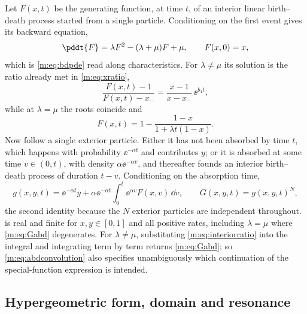 Let $F(x,t)$ be the generating function, at time $t$, of an interior linear
birth--death process started from a single particle. Conditioning on the first
event gives its backward equation,
\begin{equation}
\label{m:eq:interiorbackward}
\pddt{F} = \lambda F^2 - (\lambda+\mu)F + \mu,
\qquad F(x,0)=x ,
\end{equation}
which is \cref{m:eq:bdpde} read along characteristics. For $\lambda\neq\mu$ its
solution is the ratio already met in \cref{m:eq:xratio},
\begin{equation}
\label{m:eq:interiorratio}
\frac{F(x,t)-1}{F(x,t)-x_-} = \frac{x-1}{x-x_-}\,\ee^{b_1t},
\end{equation}
while at $\lambda=\mu$ the roots coincide and
\begin{equation}
\label{m:eq:interiorcritical}
F(x,t) = 1-\frac{1-x}{1+\lambda t(1-x)} .
\end{equation}
Now follow a single exterior particle. Either it has not been absorbed by time $t$,
which happens with probability $\ee^{-\alpha t}$ and contributes $y$; or it is
absorbed at some time $v\in(0,t)$, with density $\alpha\ee^{-\alpha v}$, and
thereafter founds an interior birth--death process of duration $t-v$. Conditioning
on the absorption time,
\begin{equation}
\label{m:eq:abdconvolution}
g(x,y,t) = \ee^{-\alpha t}y
+ \alpha\ee^{-\alpha t}\int_0^t\ee^{\alpha v}F(x,v)\,\dd v ,
\qquad
G(x,y,t) = g(x,y,t)^N ,
\end{equation}
the second identity because the $N$ exterior particles are independent throughout.
 is real and finite for $x,y\in[0,1]$ and all positive
rates, including $\lambda=\mu$ where \cref{m:eq:Gabd} degenerates. For
$\lambda\neq\mu$, substituting \cref{m:eq:interiorratio} into the integral and
integrating term by term returns \cref{m:eq:Gabd}; so \cref{m:eq:abdconvolution}
also specifies unambiguously which continuation of the special-function expression
is intended.

\subsection{Hypergeometric form, domain and resonance}
\label{m:app:abdhyp}

